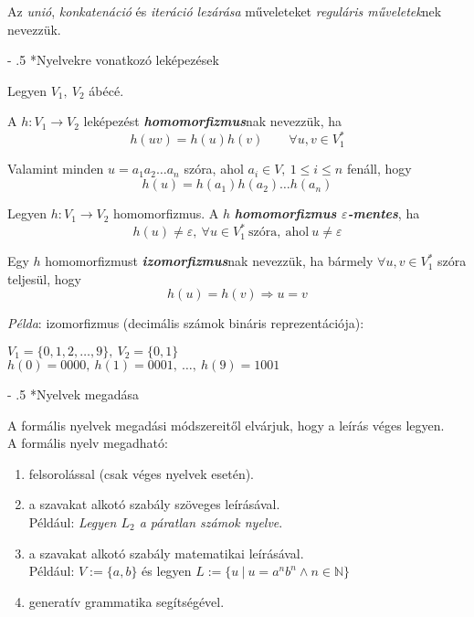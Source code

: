 \documentclass[12pt,margin=0px]{article}
\makeatletter
\renewcommand\paragraph{%
	\@startsection{paragraph}{4}{0mm}%
	{-\baselineskip}%
	{.5\baselineskip}%
	{\normalfont\normalsize\bfseries}}
\makeatother
\begin{document}
	\noindent Az \emph{unió}, \emph{konkatenáció} és \emph{iteráció lezárása} műveleteket \emph{reguláris műveletek}nek nevezzük.

    \paragraph*{Nyelvekre vonatkozó leképezések}

    \noindent Legyen $V_1,\ V_2$ ábécé.

    \noindent A $h: V_1 \to V_2$ leképezést \textbf{\emph{homomorfizmus}}nak nevezzük, ha
    \[
        h(uv) = h(u)h(v) \qquad \forall u,v \in V_1^{*}
    \]

    \noindent Valamint minden $u = a_1a_2\ldots a_n$ szóra, ahol $a_i \in V,\ 1 \leq i \leq n$ fenáll, hogy
    \[
        h(u) = h(a_1)h(a_2)\ldots h(a_n)
    \]

    \noindent Legyen $h: V_1 \to V_2$ homomorfizmus.
    \noindent A $h$ \textbf{\emph{homomorfizmus $\varepsilon$-mentes}}, ha
    \[
        h(u) \neq \varepsilon,\ \forall u \in V_1^{*}\ \text{szóra},\ \text{ahol}\ u \neq \varepsilon
    \]

    \noindent Egy $h$ homomorfizmust \textbf{\emph{izomorfizmus}}nak nevezzük, ha bármely $\forall u, v \in V_1^{*}$  szóra teljesül, hogy
    \[
        h(u) = h(v) \Rightarrow u = v
    \]

    \noindent \emph{Példa}: izomorfizmus (decimális számok bináris reprezentációja):
    \begin{center}
        $V_1 = \Big\{0,1,2,\ldots,9\Big\},\ V_2 = \Big\{0,1\Big\}$\\
        $h(0) = 0000,\ h(1) = 0001,\ \ldots,\ h(9) = 1001$
    \end{center}

    \paragraph*{Nyelvek megadása}

    \noindent A formális nyelvek megadási módszereitől elvárjuk, hogy a leírás véges legyen.\\

    \noindent A formális nyelv megadható:
    \begin{enumerate}
        \item felsorolással (csak véges nyelvek esetén).
        \item a szavakat alkotó szabály szöveges leírásával.\\
        Például: \emph{Legyen $L_2$ a páratlan számok nyelve}.
        \item a szavakat alkotó szabály matematikai leírásával.\\
        Például: $V := \{a, b\}$ és legyen $L := \{u\ |\ u = a^{n}b^{n} \wedge n \in \mathbb{N}\}$
        \item generatív grammatika segítségével.
    \end{enumerate}
\end{document}

